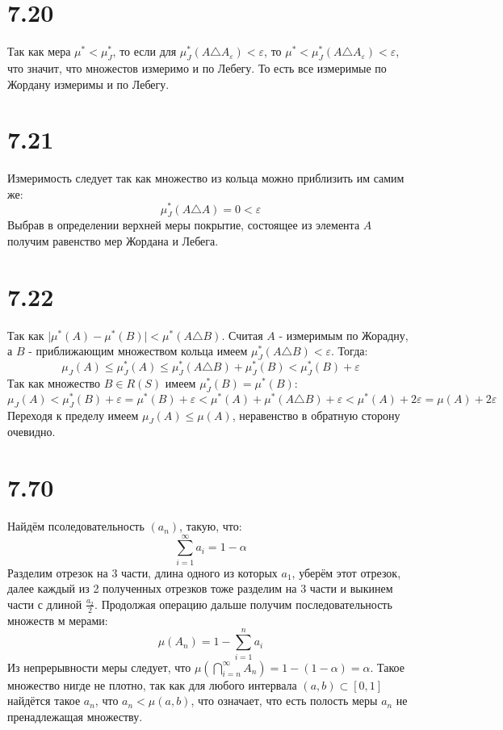 \documentclass[12pt]{article}
\begin{document}
\section{7.20}
Так как мера $\mu^{\ast} < \mu_{J}^{\ast}$, то если для $\mu^{\ast}_J (A \triangle A_{\varepsilon}) < \varepsilon$, то 
$\mu^{\ast} < \mu^{\ast}_J (A \triangle A_{\varepsilon}) < \varepsilon$, что значит, что множестов измеримо и по Лебегу. То есть 
все измеримые по Жордану измеримы и по Лебегу.
\section{7.21}
Измеримость следует так как множество из кольца можно приблизить им самим же: 
\[
    \mu^{\ast}_J (A \triangle A) = 0 < \varepsilon
\]
Выбрав в определении верхней меры покрытие, состоящее из элемента $A$ получим равенство мер Жордана и Лебега. 
\section{7.22}
Так как $\vert \mu^{\ast}(A) - \mu^{\ast}(B) \vert < \mu^{\ast} (A \triangle B)$. Считая $A$ - измеримым по Жорадну, 
а $B$ - приближающим множеством кольца имеем $\mu^{\ast}_J (A \triangle B) < \varepsilon$. Тогда:
\[
    \mu_J(A) \leq \mu^{\ast}_J(A) \leq \mu^{\ast}_J (A \triangle B) + \mu^{\ast}_J(B) < \mu^{\ast}_J(B) + \varepsilon
\]
Так как множество $B \in R(S)$ имеем $\mu^{\ast}_J(B) = \mu^{\ast}(B)$:
\[
    \mu_J(A) < \mu^{\ast}_J(B) + \varepsilon = \mu^{\ast}(B) + \varepsilon < \mu^{\ast}(A) + \mu^{\ast} (A \triangle B) + \varepsilon < 
    \mu^{\ast}(A) + 2\varepsilon = \mu(A) + 2\varepsilon
\] 
Переходя к пределу имеем $\mu_J(A) \leq \mu(A)$, неравенство в обратную сторону очевидно. 
\section{7.70}
Найдём псоледовательность $(a_n)$, такую, что: 
\[
    \sum_{i=1}^{\infty} a_i = 1 - \alpha
\] 
Разделим отрезок на 3 части, длина одного из которых $a_1$, уберём этот отрезок, далее каждый из 2 полученных отрезков тоже разделим на 
3 части и выкинем части с длиной $\frac{a_2}{2}$. Продолжая операцию дальше получим последовательность множеств м мерами: 
\[
    \mu(A_n) = 1 - \sum_{i=1}^{n} a_i 
\]  
Из непрерывности меры следует, что $\mu (\bigcap_{i=n}^{\infty} A_n) = 1 - ( 1 - \alpha) = \alpha$. Такое множество нигде не плотно, так 
как для любого интервала $(a, b) \subset [0, 1]$ найдётся такое $a_n$, что $a_n < \mu (a, b)$, что означает, что 
есть полость меры $a_n$ не пренадлежащая множеству.      
\end{document}

